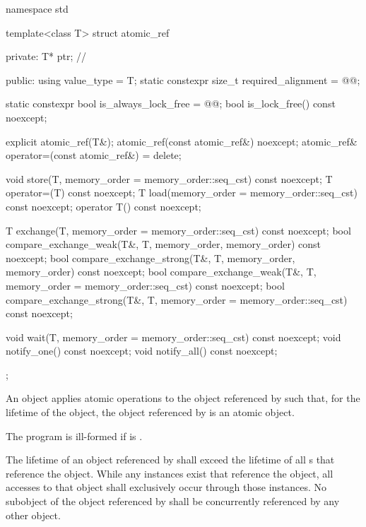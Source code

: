 %
%
\begin{codeblock}
namespace std {
  template<class T> struct atomic_ref {
  private:
    T* ptr;             // \expos

  public:
    using value_type = T;
    static constexpr size_t required_alignment = @@;

    static constexpr bool is_always_lock_free = @@;
    bool is_lock_free() const noexcept;

    explicit atomic_ref(T&);
    atomic_ref(const atomic_ref&) noexcept;
    atomic_ref& operator=(const atomic_ref&) = delete;

    void store(T, memory_order = memory_order::seq_cst) const noexcept;
    T operator=(T) const noexcept;
    T load(memory_order = memory_order::seq_cst) const noexcept;
    operator T() const noexcept;

    T exchange(T, memory_order = memory_order::seq_cst) const noexcept;
    bool compare_exchange_weak(T&, T,
                               memory_order, memory_order) const noexcept;
    bool compare_exchange_strong(T&, T,
                                 memory_order, memory_order) const noexcept;
    bool compare_exchange_weak(T&, T,
                               memory_order = memory_order::seq_cst) const noexcept;
    bool compare_exchange_strong(T&, T,
                                 memory_order = memory_order::seq_cst) const noexcept;

    void wait(T, memory_order = memory_order::seq_cst) const noexcept;
    void notify_one() const noexcept;
    void notify_all() const noexcept;
  };
}
\end{codeblock}

\pnum
An  object applies atomic operations to
the object referenced by  such that,
for the lifetime of the  object,
the object referenced by  is an atomic object.

\pnum
The program is ill-formed if  is .

\pnum
The lifetime of an object referenced by 
shall exceed the lifetime of all s that reference the object.
While any  instances exist
that reference the  object,
all accesses to that object shall exclusively occur
through those  instances.
No subobject of the object referenced by 
shall be concurrently referenced by any other  object.

